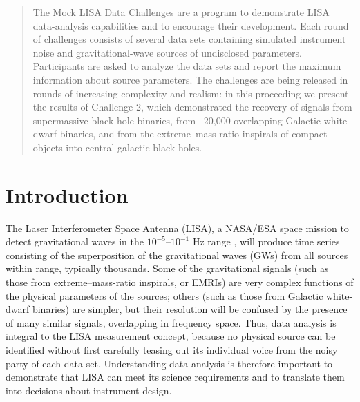 \documentclass{iopart}
\begin{document}

\begin{abstract}
The Mock LISA Data Challenges are a program to demonstrate LISA data-analysis capabilities and to encourage their development. Each round of challenges consists of several data sets containing simulated instrument noise and gravitational-wave sources of undisclosed parameters. Participants are asked to analyze the data sets and report the maximum information about source parameters. The challenges are being released in rounds of increasing complexity and realism: in this proceeding we present the results of Challenge 2, which demonstrated the recovery of signals from supermassive black-hole binaries, from ~20,000 overlapping Galactic white-dwarf binaries, and from the extreme--mass-ratio inspirals of compact objects into central galactic black holes.
\end{abstract}

\vspace{-12pt}


\section{Introduction}

The Laser Interferometer Space Antenna (LISA), a NASA/ESA space mission to detect gravitational waves in the $10^{-5}$--$10^{-1}$ Hz range \cite{lisa}, will produce time series consisting of the superposition of the gravitational waves (GWs) from all sources within range, typically thousands. Some of the gravitational signals (such as those from extreme--mass-ratio inspirals, or EMRIs) are very complex functions of the physical parameters of the sources; others (such as those from Galactic white-dwarf binaries) are simpler, but their resolution will be confused by the presence of many similar signals, overlapping in frequency space. Thus, data analysis is integral to the LISA measurement concept, because no physical source can be identified without first carefully teasing out its individual voice from the noisy party of each data set. Understanding data analysis is therefore important to demonstrate that LISA can meet its science requirements and to translate them into decisions about instrument design.
\end{document}
